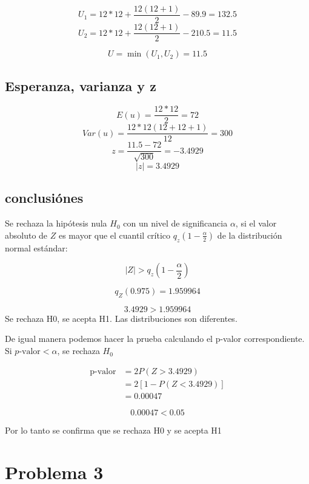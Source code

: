 \documentclass{article}
\begin{document}
\[
    U_1 = 12*12 + \frac{12(12+1)}{2} - 89.9 = 132.5
\]
\[
    U_2 = 12*12 + \frac{12(12+1)}{2} - 210.5 = 11.5
\]

\[
    U = \min(U_1, U_2) = 11.5
\]

\subsection*{Esperanza, varianza y z}

\[
    E(u) = \frac{12*12}{2} = 72
\]
\[
    Var(u) = \frac{12*12(12+12+1)}{12} = 300
\]
\[
    z = \frac{11.5 - 72}{\sqrt{300}} = -3.4929
\]
\[
    |z| = 3.4929
\]

\subsection*{conclusiónes}

Se rechaza la hipótesis nula $H_0$ con un nivel de significancia $\alpha$, si el valor absoluto de $Z$ es mayor que el cuantil crítico $q_z(1-\frac{\alpha}{2})$ de la distribución normal estándar:

\[
    |Z| > q_z\left(1-\frac{\alpha}{2}\right)
\]

\[
    q_Z (0.975) = 1.959964
\]

\[
    3.4929 > 1.959964
\]
Se rechaza H0, se acepta H1. Las distribuciones son diferentes.

De igual manera podemos hacer la prueba calculando el p-valor correspondiente. Si $p\text{-valor} < \alpha$, se rechaza $H_0$

\begin{align*}
    \text{p-valor} & = 2P(Z > 3.4929)                   \\
                   & = 2 \left[1 - P(Z < 3.4929)\right] \\
                   & = 0.00047
\end{align*}

\[0.00047 < 0.05\]

Por lo tanto se confirma que se rechaza H0 y se acepta H1

\section{Problema 3}
\end{document}
